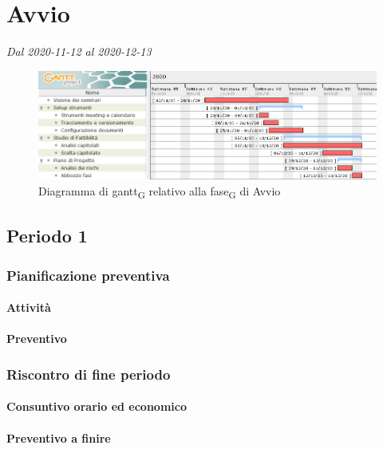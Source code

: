 \section{Avvio}
\textit{Dal 2020-11-12 al 2020-12-13}

\begin{figure}[H]
	\centering
	\includegraphics[scale=0.62]{res/images/01_gantt_avvio.png}
	\caption{Diagramma di gantt\textsubscript{G} relativo alla fase\textsubscript{G} di Avvio}
\end{figure}



\subsection{Periodo 1}

\subsubsection{Pianificazione preventiva}


\paragraph{Attività}

\planningTable{
	
}



\paragraph{Preventivo}

\smallPreventivoTable{
	
}

\subsubsection{Riscontro di fine periodo}


\paragraph{Consuntivo orario ed economico}


\paragraph{Preventivo a finire}

